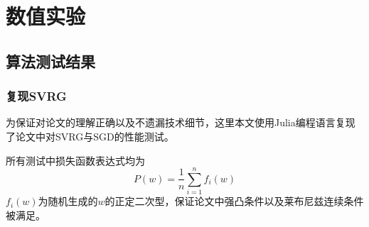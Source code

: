 
\chapter{数值实验}

\section{算法测试结果}

\subsection{复现SVRG}

为保证对论文的理解正确以及不遗漏技术细节，这里本文使用Julia编程语言复现了论文中对SVRG与SGD的性能测试。

所有测试中损失函数表达式均为
\begin{equation}\label{key}
P(w) = \frac1n \sum_{i=1}^n f_i(w)
\end{equation}
$f_i(w)$为随机生成的$w$的正定二次型，保证论文中强凸条件以及莱布尼兹连续条件被满足。

